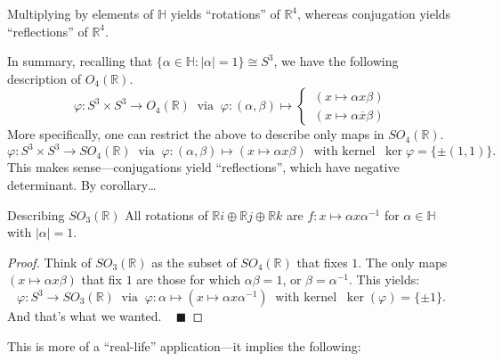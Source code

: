 \begin{remark}
    Multiplying by elements of $\mathbb{H}$ yields ``rotations'' of $\mathbb{R}^4$, whereas conjugation yields ``reflections'' of $\mathbb{R}^4$.
\end{remark}

In summary, recalling that $\{\alpha \in \mathbb{H} : |\alpha| = 1 \} \cong S^3$, we have the following description of $O_4(\mathbb{R})$.
\[ \varphi: S^3 \times S^3 \to O_4(\mathbb{R}) ~ \text{ via } ~ \varphi: (\alpha, \beta) \mapsto \begin{cases}
    \,  (x \mapsto \alpha x \beta) \\
    \, (x \mapsto \alpha\overline{x} \beta)
\end{cases} \]
More specifically, one can restrict the above to describe only maps in $SO_4(\mathbb{R})$.
\[ \varphi: S^3 \times S^3 \to SO_4(\mathbb{R}) ~ \text{ via } ~ \varphi: (\alpha, \beta) \mapsto (x \mapsto \alpha x \beta) ~ \text{ with kernel } ~ \ker \varphi = \{ \pm (1, 1)\}. \]
This makes sense---conjugations yield ``reflections'', which have negative determinant.  By corollary\dots

\begin{theorem}{Describing $SO_3(\mathbb{R})$}
    All rotations of $\mathbb{R} i \oplus \mathbb{R}j \oplus \mathbb{R}k$ are $f: x \mapsto \alpha x \alpha^{-1}$ for $\alpha \in \mathbb{H}$ with $|\alpha| = 1$.
\end{theorem}

\begin{proof}
    Think of $SO_3(\mathbb{R})$ as the subset of $SO_4(\mathbb{R})$ that fixes $1$.  The only maps $(x \mapsto \alpha x \beta)$ that fix $1$ are those for which $\alpha \beta = 1$, or $\beta = \alpha^{-1}$.  This yields:
    \[ \varphi:  S^3 \to SO_3(\mathbb{R}) ~ \text{ via } ~ \varphi : \alpha \mapsto (x \mapsto \alpha x \alpha^{-1}) ~ \text{ with kernel } ~ \ker (\varphi) = \{ \pm 1\}. \]
    And that's what we wanted. ~ $\blacksquare$
\end{proof}

This is more of a ``real-life'' application---it implies the following:


